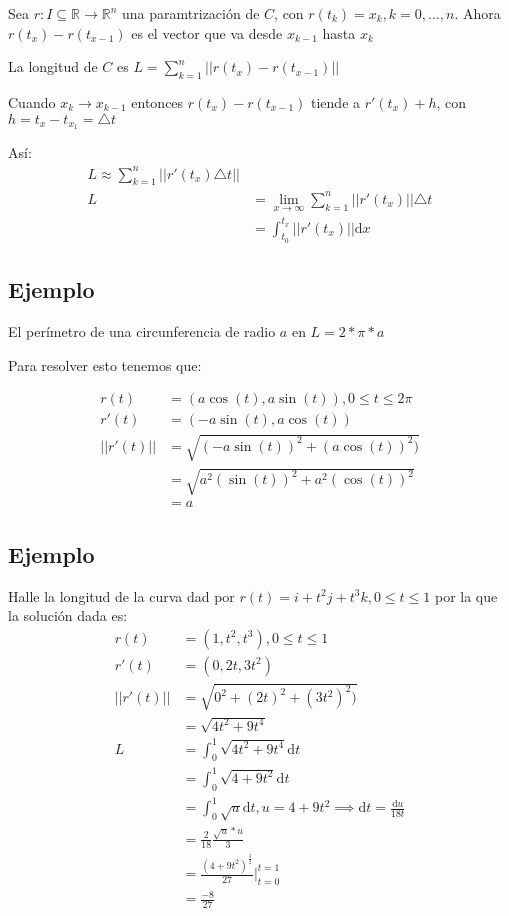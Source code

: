 \documentclass{article}
\newcommand{\field}[1]{\mathbb{#1}}
\newcommand{\R}{\field{R}}
\begin{document}
Sea $ r:I \subseteq \R \longrightarrow \R^{n} $ una paramtrización de $ C $, con
$ r(t_k) = x_k, k = 0 , ... , n$. Ahora $r(t_x) - r(t_{x - 1})$ es el vector que
va desde $x_{k - 1}$ hasta $x_{k}$

La longitud de $ C $ es $ L = \sum_{k=1}^{n}||r(t_x) - r(t_{x - 1})||$

Cuando $ x_k \longrightarrow x_{k-1} $ entonces $r(t_x) - r(t_{x - 1}) $ tiende
a $ r'(t_x) + h $, con $ h = t_x-t_{x_1} = \triangle t $

Así:
\begin{align}
  L \approx \sum_{k=1}^{n}||r'(t_x) \triangle t|| \\
  L &= \lim_{x\rightarrow\infty} \sum_{k=1}^{n}||r'(t_x)|| \triangle t \\
  &= \int_{t_0}^{t_x} ||r'(t_x)|| \mathrm{d}x
\end{align}

\subsection*{Ejemplo}

El perímetro de una circunferencia de radio $a$ en $ L = 2*\pi*a $

Para resolver esto tenemos que:

\begin{align}
  r(t) &= (a\cos(t), a\sin(t)), 0 \leq t \leq 2\pi \\
  r'(t) &= (-a\sin(t), a\cos(t)) \\
  || r'(t) || &= \sqrt{(-a\sin(t))^2 + (a\cos(t))^2)} \\
              &= \sqrt{a^2(\sin(t))^2 + a^2(\cos(t))^2} \\
              &= a
\end{align}

\subsection*{Ejemplo}

Halle la longitud de la curva dad por
$ r(t) = i + t^2j + t^3k, 0 \leq t \leq 1 $ por la que la solución dada es:
\begin{align}
  r(t) &= (1, t^2, t^3), 0 \leq t \leq 1 \\
  r'(t) &= (0, 2t, 3t^2) \\
  || r'(t) || &= \sqrt{0^2 + (2t)^2 + (3t^2)^2)} \\
              &= \sqrt{4t^2 + 9t^4} \\
  L &= \int_0^1 \sqrt{4t^2 + 9t^4} \mathrm{d}t \\
    &= \int_0^1 \sqrt{4 + 9t^2} \mathrm{d}t \\
    &= \int_0^1 \sqrt{u} \mathrm{d}t, u = 4 + 9t^2 \implies \mathrm{d}t = \frac{\mathrm{d}u}{18t} \\
    &= \frac{2}{18} \frac{\sqrt{u}*u}{3}  \\
    &= \frac{(4 + 9t^2)^{\frac{3}{2}}}{27} \Biggr|_{t=0}^{t=1} \\
    &= \frac{-8}{27}  \\
\end{align}

\section{}
\end{document}
